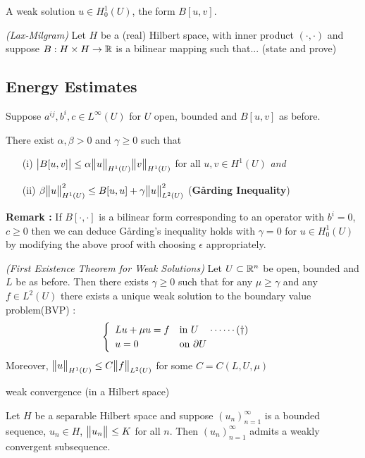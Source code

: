 \documentclass[10pt,a4paper]{report}
\begin{document}
 A weak solution $u\in H^1_0(U)$, the form $B[u,v]$.
\s

\thm \emph{(Lax-Milgram)} Let $H$ be a (real) Hilbert space, with inner product $(\cdot, \cdot)$ and suppose $B : H\times H \rightarrow \mathbb{R}$ is a bilinear mapping such that... (state and prove)

\subsection*{Energy Estimates}

Suppose $a^{ij}, b^i, c \in L^{\infty}(U)$ for $U$ open, bounded and $B[u,v]$ as before.
\s

\thm There exist $\alpha, \beta >0$ and $\gamma \geq 0$ such that
\begin{itemize}
\item[(i)] $\big| B[u,v]\big| \leq \alpha \bigl\lVert u\bigr\rVert_{H^1(U)} \bigl\lVert v\bigr\rVert_{H^1(U)}$ for all $u,v\in H^1(U)$ \quad \emph{and}
\item[(ii)] $\beta \bigl\lVert u\bigr\rVert_{H^1(U)}^2 \leq B[u,u] + \gamma \bigl\lVert u\bigr\rVert_{L^2(U)}^2$ (\textbf{G{\aa}rding Inequality})
\end{itemize}
\s

\textbf{Remark :} If $B[\cdot,\cdot]$ is a bilinear form corresponding to an operator with $b^i=0$, $c\geq 0$ then we can deduce G{\aa}rding's inequality holds with $\gamma =0$ for $u\in H_0^1 (U)$ by modifying the above proof with choosing $\epsilon$ appropriately.
\s

\thm \emph{(First Existence Theorem for Weak Solutions)} Let $U\subset \mathbb{R}^n$ be open, bounded and $L$ be as before. Then there exists $\gamma \geq 0$ such that for any $\mu \geq \gamma$ and any $f\in L^2(U)$ there exists a unique weak solution to the boundary value problem(BVP) :
\begin{align*}
\begin{cases}
\begin{array}{ll}
Lu + \mu u =f & \text{in } U  \quad \cdots\cdots (\dagger) \\
u = 0 & \text{on } \partial U
\end{array}
\end{cases}
\end{align*}
Moreover, $\bigl\lVert u\bigr\rVert_{H^1(U)} \leq C \bigl\lVert f\bigr\rVert_{L^2(U)}$ for some $C = C(L,U,\mu)$
\s

 weak convergence (in a Hilbert space)
\s

\thm Let $H$ be a separable Hilbert space and suppose $(u_n)_{n=1}^{\infty}$ is a bounded sequence, $u_n \in H$, $\bigl\lVert u_n\bigr\rVert_{} \leq K$ for all $n$. Then $(u_n)_{n=1}^{\infty}$ admits a weakly convergent subsequence.
\s
\end{document}
